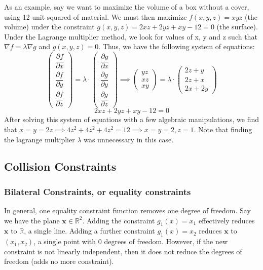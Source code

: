 \documentclass{article}
\begin{document}
As an example, say we want to maximize the volume of a box without a cover, using 12 unit squared of material. We must then maximize $f(x,y,z) = xyz $ (the volume) under the constraint $g(x,y,z) = 2xz + 2yz + xy - 12 = 0$ (the surface). Under the Lagrange multiplier method, we look for values of x, y and z such that $\nabla f = \lambda \nabla g$ and $g(x,y,z) = 0$. Thus, we have the following system of equations:
\begin{equation}
\begin{pmatrix}
    \dfrac{\partial f}{\partial x} \\ \dfrac{\partial f}{\partial y} \\ \dfrac{\partial f}{\partial z}
\end{pmatrix} = 
\lambda \cdot
\begin{pmatrix}
    \dfrac{\partial g}{\partial x} \\ \dfrac{\partial g}{\partial y} \\ \dfrac{\partial g}{\partial z}
\end{pmatrix} \implies 
\begin{pmatrix}
    yz \\ xz \\ xy
\end{pmatrix} = 
\lambda \cdot
\begin{pmatrix}
    2z+y \\ 2z+x \\ 2x + 2y
\end{pmatrix}
\end{equation}
\begin{equation}
2xz + 2yz + xy - 12 = 0
\end{equation}
After solving this system of equations with a few algebraic manipulations, we find that $x = y = 2z \implies 4 z^2+ 4 z^2+ 4 z^2 = 12 \implies x = y = 2, z=1$. Note that finding the lagrange multiplier $\lambda$ was unnecessary in this case.

\subsection{Collision Constraints}
\subsubsection{Bilateral Constraints, or equality constraints}
In general, one equality constraint function removes one degree of freedom. Say we have the plane $\mathbf{x} \in \mathbb{R}^2$. Adding the constraint $g_1(x) = x_1$ effectively reduces $\mathbf{x}$ to $\mathbb{R}$, a single line. Adding a further constraint $g_1(x) = x_2$ reduces $\mathbf{x}$ to $(x_1, x_2)$, a single point with 0 degrees of freedom. However, if the new constraint is not linearly independent, then it does not reduce the degrees of freedom (adds no more constraint).
\end{document}
